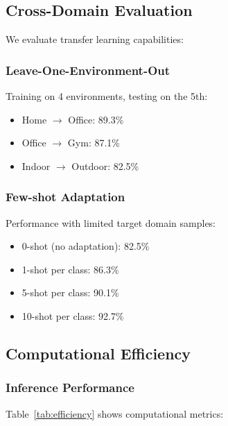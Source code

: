 \documentclass[journal]{IEEEtran}
\begin{document}
\subsection{Cross-Domain Evaluation}

We evaluate transfer learning capabilities:

\subsubsection{Leave-One-Environment-Out}

Training on 4 environments, testing on the 5th:

\begin{itemize}
\item Home $\rightarrow$ Office: 89.3\%
\item Office $\rightarrow$ Gym: 87.1\%
\item Indoor $\rightarrow$ Outdoor: 82.5\%
\end{itemize}

\subsubsection{Few-shot Adaptation}

Performance with limited target domain samples:

\begin{itemize}
\item 0-shot (no adaptation): 82.5\%
\item 1-shot per class: 86.3\%
\item 5-shot per class: 90.1\%
\item 10-shot per class: 92.7\%
\end{itemize}

\subsection{Computational Efficiency}

\subsubsection{Inference Performance}

Table~\ref{tab:efficiency} shows computational metrics:
\end{document}

